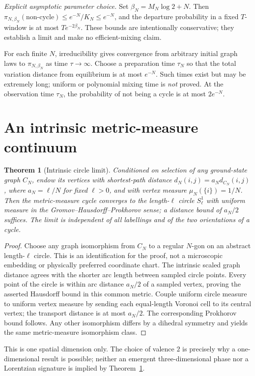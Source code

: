 \documentclass[11pt,a4paper]{article}
\numberwithin{equation}{section}
\newtheorem{theorem}{Theorem}[section]
\newcommand{\1}{\mathbf{1}}
\begin{document}
\noindent\textit{Explicit asymptotic parameter choice.} Set $\beta_N=M_N\log2+N$. Then $\pi_{N,\beta_N}(\text{non-cycle})\leq e^{-N}/K_N\leq e^{-N}$, and the departure probability in a fixed $T$-window is at most $Te^{-2\beta_N}$. These bounds are intentionally conservative; they establish a limit and make no efficient-mixing claim.

For each finite $N$, irreducibility gives convergence from arbitrary initial graph laws to $\pi_{N,\beta_N}$ as time $\tau\to\infty$. Choose a preparation time $\tau_N$ so that the total variation distance from equilibrium is at most $e^{-N}$. Such times exist but may be extremely long; uniform or polynomial mixing time is \emph{not} proved. At the observation time $\tau_N$, the probability of not being a cycle is at most $2e^{-N}$.

\section{An intrinsic metric-measure continuum}
\begin{theorem}[Intrinsic circle limit]\label{thm:circle}
Conditioned on selection of any ground-state graph $C_N$, endow its vertices with shortest-path distance $d_N(i,j)=a_Nd_{C_N}(i,j)$, where $a_N=\ell/N$ for fixed $\ell>0$, and with vertex measure $\mu_N(\{i\})=1/N$. Then the metric-measure cycle converges to the length-$\ell$ circle $S^1_\ell$ with uniform measure in the Gromov--Hausdorff--Prokhorov sense; a distance bound of $a_N/2$ suffices. The limit is independent of all labellings and of the two orientations of a cycle.
\end{theorem}
\begin{proof}
Choose any graph isomorphism from $C_N$ to a regular $N$-gon on an abstract length-$\ell$ circle. This is an identification for the proof, not a microscopic embedding or physically preferred coordinate chart. The intrinsic scaled graph distance agrees with the shorter arc length between sampled circle points. Every point of the circle is within arc distance $a_N/2$ of a sampled vertex, proving the asserted Hausdorff bound in this common metric. Couple uniform circle measure to uniform vertex measure by sending each equal-length Voronoi cell to its central vertex; the transport distance is at most $a_N/2$. The corresponding Prokhorov bound follows. Any other isomorphism differs by a dihedral symmetry and yields the same metric-measure isomorphism class.
\end{proof}
This is one spatial dimension only. The choice of valence $2$ is precisely why a one-dimensional result is possible; neither an emergent three-dimensional phase nor a Lorentzian signature is implied by Theorem~\ref{thm:circle}.
\end{document}
